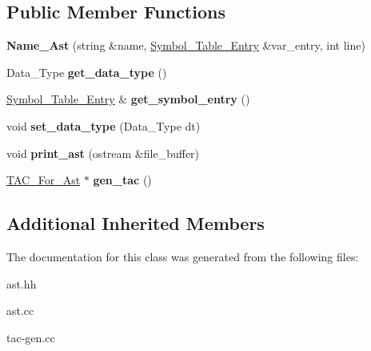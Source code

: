 \subsection*{Public Member Functions}
\begin{DoxyCompactItemize}
\item 
\mbox{\label{className__Ast_aa73792d7592a8591fe1e3a537010684e}} 
{\bfseries Name\+\_\+\+Ast} (string \&name, \hyperlink{classSymbol__Table__Entry}{Symbol\+\_\+\+Table\+\_\+\+Entry} \&var\+\_\+entry, int line)
\item 
\mbox{\label{className__Ast_afe2edab510b3ceddbe40935b32e06a82}} 
Data\+\_\+\+Type {\bfseries get\+\_\+data\+\_\+type} ()
\item 
\mbox{\label{className__Ast_a877fae84cc08c4102287da72162211a7}} 
\hyperlink{classSymbol__Table__Entry}{Symbol\+\_\+\+Table\+\_\+\+Entry} \& {\bfseries get\+\_\+symbol\+\_\+entry} ()
\item 
\mbox{\label{className__Ast_a985865998af4ac911af0a35485d597c0}} 
void {\bfseries set\+\_\+data\+\_\+type} (Data\+\_\+\+Type dt)
\item 
\mbox{\label{className__Ast_a5eb6335143d6d4668cd4068a08732927}} 
void {\bfseries print\+\_\+ast} (ostream \&file\+\_\+buffer)
\item 
\mbox{\label{className__Ast_a576275f403384e19f023879ab4ca493b}} 
\hyperlink{classTAC__For__Ast}{T\+A\+C\+\_\+\+For\+\_\+\+Ast} $\ast$ {\bfseries gen\+\_\+tac} ()
\end{DoxyCompactItemize}
\subsection*{Additional Inherited Members}


The documentation for this class was generated from the following files\+:\begin{DoxyCompactItemize}
\item 
ast.\+hh\item 
ast.\+cc\item 
tac-\/gen.\+cc\end{DoxyCompactItemize}
